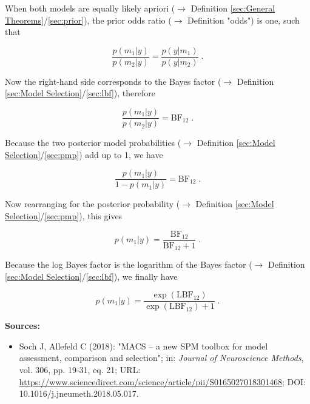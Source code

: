 \documentclass[a4paper,12pt,twoside]{book}
\begin{document}
When both models are equally likely apriori ($\rightarrow$ Definition \ref{sec:General Theorems}/\ref{sec:prior}), the prior odds ratio ($\rightarrow$ Definition "odds") is one, such that

\begin{equation} \label{eq:pmp-lbf-post-odds-s2}
\frac{p(m_1|y)}{p(m_2|y)} = \frac{p(y|m_1)}{p(y|m_2)} \; .
\end{equation}

Now the right-hand side corresponds to the Bayes factor ($\rightarrow$ Definition \ref{sec:Model Selection}/\ref{sec:lbf}), therefore

\begin{equation} \label{eq:pmp-lbf-post-odds-s4}
\frac{p(m_1|y)}{p(m_2|y)} = \mathrm{BF}_{12} \; .
\end{equation}

Because the two posterior model probabilities ($\rightarrow$ Definition \ref{sec:Model Selection}/\ref{sec:pmp}) add up to 1, we have

\begin{equation} \label{eq:pmp-lbf-post-odds-s3}
\frac{p(m_1|y)}{1-p(m_1|y)} = \mathrm{BF}_{12} \; .
\end{equation}

Now rearranging for the posterior probability ($\rightarrow$ Definition \ref{sec:Model Selection}/\ref{sec:pmp}), this gives

\begin{equation} \label{eq:pmp-lbf-post-s1}
p(m_1|y) = \frac{\mathrm{BF}_{12}}{\mathrm{BF}_{12} + 1} \; .
\end{equation}

Because the log Bayes factor is the logarithm of the Bayes factor ($\rightarrow$ Definition \ref{sec:Model Selection}/\ref{sec:lbf}), we finally have

\begin{equation} \label{eq:pmp-lbf-post-s2}
p(m_1|y) = \frac{\exp(\mathrm{LBF}_{12})}{\exp(\mathrm{LBF}_{12}) + 1} \; .
\end{equation}


\vspace{1em}
\textbf{Sources:}
\begin{itemize}
\item Soch J, Allefeld C (2018): "MACS – a new SPM toolbox for model assessment, comparison and selection"; in: \textit{Journal of Neuroscience Methods}, vol. 306, pp. 19-31, eq. 21; URL: \url{https://www.sciencedirect.com/science/article/pii/S0165027018301468}; DOI: 10.1016/j.jneumeth.2018.05.017.
\end{itemize}
\end{document}
